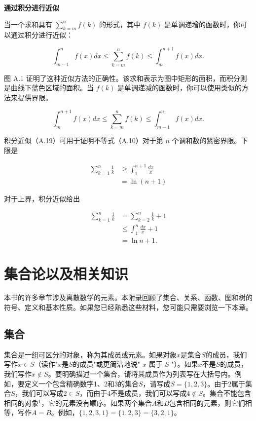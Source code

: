 \documentclass[lang=cn,newtx,10pt,scheme=chinese]{elegantbook}
\begin{document}
\textbf{通过积分进行近似}

当一个求和具有 $\sum_{k=m}^n f(k)$ 的形式，其中 $f(k)$ 是单调递增的函数时，你可以通过积分进行近似：

$$
\int_{m-1}^n f(x) d x \leq \sum_{k=m}^n f(k) \leq \int_m^{n+1} f(x) d x .
$$

图 A.1 证明了这种近似方法的正确性。该求和表示为图中矩形的面积，而积分则是曲线下蓝色区域的面积。当 $f(k)$ 是单调递减的函数时，你可以使用类似的方法来提供界限。

$$
\int_m^{n+1} f(x) d x \leq \sum_{k=m}^n f(k) \leq \int_{m-1}^n f(x) d x .
$$

积分近似（A.19）可用于证明不等式（A.10）对于第 $n$ 个调和数的紧密界限。下限是

$$
\begin{aligned}
\sum_{k=1}^n \frac{1}{k} & \geq \int_1^{n+1} \frac{d x}{x} \\
& =\ln (n+1)
\end{aligned}
$$

对于上界，积分近似给出

$$
\begin{aligned}
\sum_{k=1}^n \frac{1}{k} & =\sum_{k=2}^n \frac{1}{k}+1 \\
& \leq \int_1^n \frac{d x}{x}+1 \\
& =\ln n+1 .
\end{aligned}
$$

\chapter{集合论以及相关知识}

本书的许多章节涉及离散数学的元素。本附录回顾了集合、关系、函数、图和树的符号、定义和基本性质。如果您已经熟悉这些材料，您可能只需要浏览一下本章。

\section{集合}

集合是一组可区分的对象，称为其成员或元素。如果对象$x$是集合$S$的成员，我们写作$x \in S$（读作"$x$是$S$的成员"或更简洁地说" $x$ 属于 $S$ "）。如果$x$不是$S$的成员，我们写作$x \notin S$。要明确描述一个集合，请将其成员作为列表写在大括号内。例如，要定义一个包含精确数字1、2和3的集合$S$，请写成$S=\{1,2,3\}$。由于2属于集合$S$，我们可以写成$2 \in S$，而由于4不是成员，我们可以写成$4 \notin S$。集合不能包含相同的对象${ }^1$，它的元素没有顺序。如果两个集合$A$和$B$包含相同的元素，则它们相等，写作$A=B$。例如，$\{1,2,3,1\}=\{1,2,3\}=\{3,2,1\}$。
\end{document}

